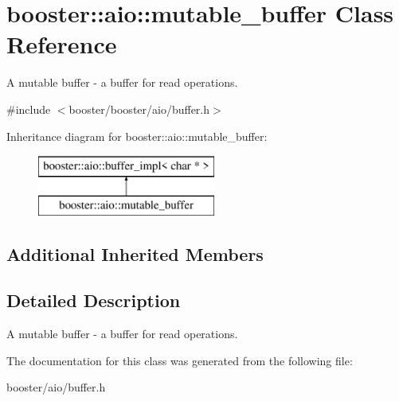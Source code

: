 \section{booster\+:\+:aio\+:\+:mutable\+\_\+buffer Class Reference}
\label{classbooster_1_1aio_1_1mutable__buffer}


A mutable buffer -\/ a buffer for read operations.  




{\ttfamily \#include $<$booster/booster/aio/buffer.\+h$>$}

Inheritance diagram for booster\+:\+:aio\+:\+:mutable\+\_\+buffer\+:\begin{figure}[H]
\begin{center}
\leavevmode
\includegraphics[height=2.000000cm]{classbooster_1_1aio_1_1mutable__buffer}
\end{center}
\end{figure}
\subsection*{Additional Inherited Members}


\subsection{Detailed Description}
A mutable buffer -\/ a buffer for read operations. 

The documentation for this class was generated from the following file\+:\begin{DoxyCompactItemize}
\item 
booster/aio/buffer.\+h\end{DoxyCompactItemize}
